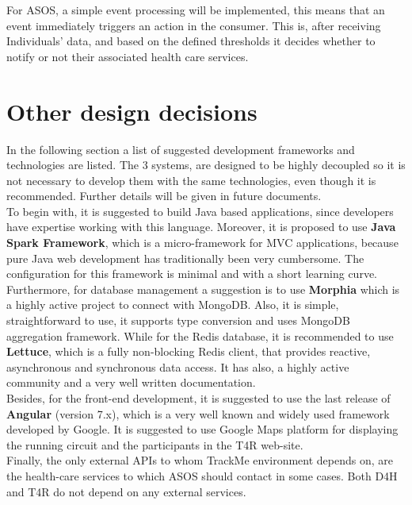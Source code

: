 \documentclass[a4paper, hidelinks, 12pt]{report}
\begin{document}
	For ASOS, a simple event processing will be implemented, this means that an event immediately triggers an action in the consumer. This is, after receiving  Individuals' data, and based on the defined thresholds it decides whether to notify or not their associated health care services. 
	
	\section{Other design decisions}
	In the following section a list of suggested development frameworks and technologies	are listed. The 3 systems, are designed to be highly decoupled so it is not necessary to develop them with the same technologies, even though it is recommended. Further details will be given in future documents.\\
	
	To begin with, it is suggested to build Java based applications, since developers have expertise working with this language. Moreover, it is proposed to use \textbf{Java Spark Framework}, which is a micro-framework for MVC applications, because pure Java web development has traditionally been very cumbersome. The configuration for this framework is minimal and with a short learning curve. \\
	
	Furthermore, for database management a suggestion is to use \textbf{Morphia} which is a highly active project to connect with MongoDB. Also, it is simple, straightforward to use, it supports type conversion and uses MongoDB aggregation framework. While for the Redis database, it is recommended to use \textbf{Lettuce}, which is a fully non-blocking Redis client, that provides reactive, asynchronous and synchronous data access. It has also, a highly active community and a very well written documentation.\\
	
	Besides, for the front-end development, it is suggested to use the last release of \textbf{Angular} (version 7.x), which is a very well known and widely used framework developed by Google. It is suggested to use Google Maps platform for displaying the running circuit and the participants in the T4R web-site.\\
	
	Finally, the only external APIs to whom TrackMe environment depends on, are the health-care services to which ASOS should contact in some cases. Both D4H and T4R do not depend on any external services.
	
\end{document}
